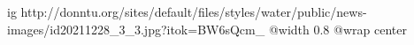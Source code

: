  
 
 
 
 

\ifcmt
  ig http://donntu.org/sites/default/files/styles/water/public/news-images/id20211228_3_3.jpg?itok=BW6sQcm_
  @width 0.8
	@wrap center
\fi
